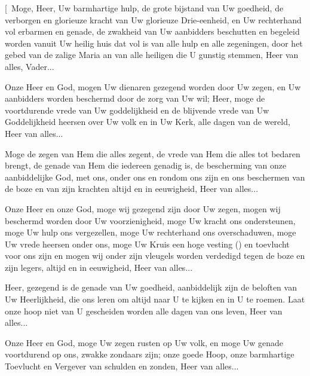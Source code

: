 \documentclass[12pt,twoside,a5paper]{article}
\begin{document}



\begin{halfparskip}
  [\cc~Moge, Heer, Uw barmhartige hulp, de grote bijstand van Uw goedheid, de verborgen en glorieuze kracht van Uw glorieuze Drie-eenheid, en Uw rechterhand vol erbarmen en genade, de zwakheid van Uw aanbidders beschutten en begeleid worden vanuit Uw heilig huis dat vol is van alle hulp en alle zegeningen, door het gebed van de zalige Maria an van alle heiligen die U gunstig stemmen, Heer van alles, Vader...

   Onze Heer en God, mogen Uw dienaren gezegend worden door Uw zegen, en Uw aanbidders worden beschermd door de zorg van Uw wil; Heer, moge de voortdurende vrede van Uw goddelijkheid en de blijvende vrede van Uw Goddelijkheid heersen over Uw volk en in Uw Kerk, alle dagen van de wereld, Heer van alles...

   Moge de zegen van Hem die alles zegent, de vrede van Hem die alles tot bedaren brengt, de genade van Hem die iedereen genadig is, de bescherming van onze aanbiddelijke God, met ons, onder ons en rondom ons zijn en ons beschermen van de boze en van zijn krachten altijd en in eeuwigheid, Heer van alles...

   Onze Heer en onze God, moge wij gezegend zijn door Uw zegen, mogen wij beschermd worden door Uw voorzienigheid, moge Uw kracht ons ondersteunen, moge Uw hulp ons vergezellen, moge Uw rechterhand ons overschaduwen, moge Uw vrede heersen onder ons, moge Uw Kruis een hoge vesting () en toevlucht voor ons zijn en mogen wij onder zijn vleugels worden verdedigd tegen de boze en zijn legers, altijd en in eeuwigheid, Heer van alles...

   Heer, gezegend is de genade van Uw goedheid, aanbiddelijk zijn de beloften van Uw Heerlijkheid, die ons leren om altijd naar U te kijken en in U te roemen. Laat onze hoop niet van U gescheiden worden alle dagen van ons leven, Heer van alles...

   Onze Heer en God, moge Uw zegen rusten op Uw volk, en moge Uw genade voortdurend op ons, zwakke zondaars zijn; onze goede Hoop, onze barmhartige Toevlucht en Vergever van schulden en zonden, Heer van alles...


\end{halfparskip}
\end{document}
